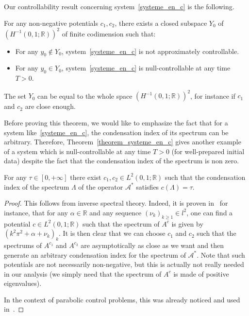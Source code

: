 \documentclass[AHL,Unicode,longabstracts]{cedram}
\newcommand\As{\mathcal{A}^*}
\newcommand{\Fzp}{Y_0}
\newcommand{\R}{\mathbb{R}}
\begin{document}
Our controllability result concerning system~\eqref{systeme_en_c} is the following.
\begin{theo}\label{theorem_systeme_en_c}
For any non-negative potentials $c_1,c_2$, there exists a closed subspace $\Fzp$ of $(H^{-1}(0,1 ; \R))^2$ of finite codimension such that:
\begin{itemize}
\item For any $y_0\not\in \Fzp$, system~\eqref{systeme_en_c} is not approximately controllable.
\item For any $y_0\in \Fzp$, system~\eqref{systeme_en_c} is null-controllable at any time $T>0$.
\end{itemize}
\end{theo}

\begin{rema}
The set $\Fzp$ can be equal to the whole space $(H^{-1}(0,1 ; \R))^2$, for instance if $c_1$ and $c_2$ are close enough.
\end{rema}

Before proving this theorem, we would like to emphasize the fact that for a system like~\eqref{systeme_en_c}, the condensation index of its spectrum can be arbitrary. Therefore, Theorem~\ref{theorem_systeme_en_c} gives another example of a system which is null-controllable at any time $T>0$ (for well-prepared initial data) despite the fact that the condensation index of the spectrum is non zero.

\begin{prop}
For any $\tau\in [0,+\infty]$ there exist $c_1,c_2\in L^2(0,1;\R)$ such that the condensation index of the spectrum $\Lambda$ of the operator $\As$ satisfies $c(\Lambda)=\tau$.
\end{prop}

\begin{proof}
This follows from inverse spectral theory. Indeed, it is proven in~\cite[Chapter~3]{PoeschelTrubowitz:1987} for instance, that for any $\alpha\in \R$ and any sequence $(\nu_k)_{k\geq 1}\in l^2$, one can find a potential $c\in L^2(0,1;\R)$ such that the spectrum of $A^c$ is given by $(k^2\pi^2 + \alpha + \nu_k)_k$. It is then clear that we can choose $c_1$ and $c_2$ such that the spectrums of $A^{c_1}$ and $A^{c_2}$ are asymptotically as close as we want and then generate an arbitrary condensation index for the spectrum of $\As$. Note that such potentials are not necessarily non-negative, but this is actually not really needed in our analysis (we simply need that the spectrum of $A^c$ is made of positive eigenvalues).

In the context of parabolic control problems, this was already noticed and used in~\cite{Ouaili18}.
\end{proof}
\end{document}
